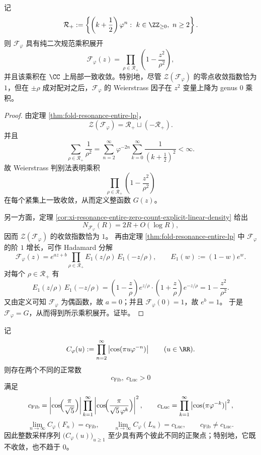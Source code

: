 \begin{theorem}\label{thm:conclusion-golden-resonance-weierstrass-genus-drop}
记
\[
\mathcal R_+:=
\left\{
\left(k+\frac12\right)\varphi^n:
\ k\in\ZZ_{\ge 0},\ n\ge 2
\right\}.
\]
则 \(\mathcal F_\varphi\) 具有纯二次规范乘积展开
\[
\mathcal F_\varphi(z)=\prod_{\rho\in\mathcal R_+}\left(1-\frac{z^2}{\rho^2}\right),
\]
并且该乘积在 \(\CC\) 上局部一致收敛。特别地，尽管
\(\mathcal Z(\mathcal F_\varphi)\) 的零点收敛指数恰为 \(1\)，但在 \(\pm\rho\) 成对配对之后，\(\mathcal F_\varphi\) 的 Weierstrass 因子在 \(z^2\) 变量上降为 genus \(0\) 乘积。
\end{theorem}

\begin{proof}
由定理 \ref{thm:fold-resonance-entire-lp}，
\[
\mathcal Z(\mathcal F_\varphi)=\mathcal R_+\sqcup(-\mathcal R_+).
\]
并且
\[
\sum_{\rho\in\mathcal R_+}\frac{1}{\rho^2}
=
\sum_{n=2}^{\infty}\varphi^{-2n}
\sum_{k=0}^{\infty}\frac{1}{(k+\tfrac12)^2}
<
\infty.
\]
故 Weierstrass 判别法表明乘积
\[
\prod_{\rho\in\mathcal R_+}\left(1-\frac{z^2}{\rho^2}\right)
\]
在每个紧集上一致收敛，从而定义整函数 \(G(z)\)。

另一方面，定理 \ref{cor:xi-resonance-entire-zero-count-explicit-linear-density} 给出
\[
N_{\mathcal F_\varphi}(R)=2R+O(\log R),
\]
因而 \(\mathcal Z(\mathcal F_\varphi)\) 的收敛指数恰为 \(1\)。
再由定理 \ref{thm:fold-resonance-entire-lp} 中 \(\mathcal F_\varphi\) 的阶 \(1\) 增长，可作 Hadamard 分解
\[
\mathcal F_\varphi(z)
=
e^{az+b}
\prod_{\rho\in\mathcal R_+}
E_1(z/\rho)\,E_1(-z/\rho),
\qquad
E_1(w):=(1-w)e^w.
\]
对每个 \(\rho\in\mathcal R_+\) 有
\[
E_1(z/\rho)\,E_1(-z/\rho)
=
\left(1-\frac{z}{\rho}\right)e^{z/\rho}
\cdot
\left(1+\frac{z}{\rho}\right)e^{-z/\rho}
=
1-\frac{z^2}{\rho^2}.
\]
又由定义可知 \(\mathcal F_\varphi\) 为偶函数，故 \(a=0\)；并且
\(\mathcal F_\varphi(0)=1\)，故 \(e^b=1\)。
于是 \(\mathcal F_\varphi=G\)，从而得到所示乘积展开。证毕。
\end{proof}

\begin{theorem}\label{thm:conclusion-golden-resonance-fib-luc-two-positive-clusters}
记
\[
C_\varphi(u):=\prod_{n=2}^{\infty}\left|\cos(\pi u\varphi^{-n})\right|
\qquad (u\in\RR).
\]
则存在两个不同的正常数
\[
c_{\mathrm{Fib}},\ c_{\mathrm{Luc}}>0
\]
满足
\[
c_{\mathrm{Fib}}
=
\left|\cos\!\Bigl(\frac{\pi}{\sqrt5}\Bigr)\right|
\prod_{k=1}^{\infty}
\left|\cos\!\Bigl(\frac{\pi}{\sqrt5\,\varphi^{k}}\Bigr)\right|^2,
\qquad
c_{\mathrm{Luc}}
=
\prod_{k=1}^{\infty}\left|\cos(\pi\varphi^{-k})\right|^2,
\]
\[
\lim_{n\to\infty}C_\varphi(F_n)=c_{\mathrm{Fib}},
\qquad
\lim_{n\to\infty}C_\varphi(L_n)=c_{\mathrm{Luc}},
\qquad
c_{\mathrm{Fib}}\neq c_{\mathrm{Luc}}.
\]
因此整数采样序列 \(\bigl(C_\varphi(u)\bigr)_{u\ge 1}\) 至少具有两个彼此不同的正聚点；特别地，它既不收敛，也不趋于 \(0\)。
\end{theorem}

